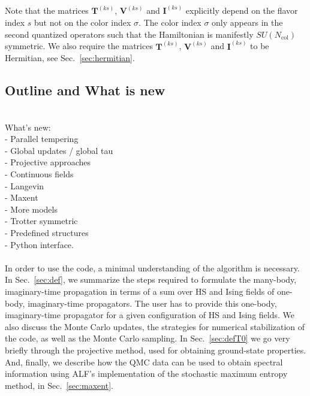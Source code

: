 Note that the matrices  $\bm{T}^{(ks)}$,  $\bm{V}^{(ks)}$ and  $\bm{I}^{(ks)}$ explicitly depend on the flavor index $s$ but not on the color index $\sigma$. 
The color index $\sigma$ only appears in  the  second quantized operators such that the Hamiltonian is manifestly $SU(N_{\mathrm{col}})$    symmetric.  We also require
the matrices $\bm{T}^{(ks)}$,  $\bm{V}^{(ks)}$ and  $\bm{I}^{(ks)}$  to be  Hermitian, see Sec.~\ref{sec:hermitian}.

\subsection{Outline and What is new }

\\

What's new:\\
- Parallel tempering\\
- Global updates / global tau\\
- Projective approaches\\
- Continuous fields\\
- Langevin\\
- Maxent\\
- More models\\
- Trotter symmetric\\
- Predefined structures\\
- Python interface.\\ \\

In order to use the code, a minimal understanding of the algorithm is necessary. 
In Sec.~\ref{sec:def}, we summarize the steps required to formulate the many-body, imaginary-time propagation in terms of a sum over HS and Ising fields of one-body, imaginary-time propagators.   
The user has to provide this one-body, imaginary-time propagator for a given configuration of HS and  Ising fields. We also discuss the Monte Carlo updates, the strategies for numerical stabilization of the code, as well as the Monte Carlo sampling.
In Sec.~\ref{sec:defT0} we go very briefly through the projective method, used for obtaining ground-state properties.
And, finally, we describe how the QMC data can be used to obtain spectral information using ALF's implementation of the stochastic maximum entropy method, in Sec.~\ref{sec:maxent}.

